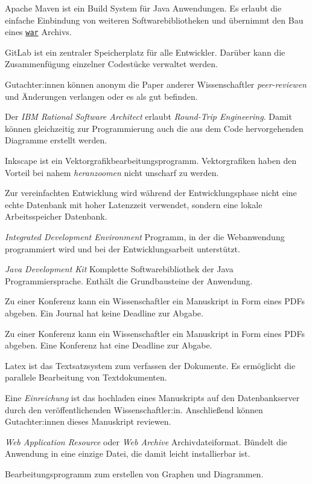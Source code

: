 
\begin{description}
	 Apache Maven ist ein Build System für Java Anwendungen. Es erlaubt die einfache Einbindung von weiteren Softwarebibliotheken und übernimmt den Bau eines \hyperref[glo:war]{\texttt{war}} Archivs.

	 GitLab ist ein zentraler Speicherplatz für alle Entwickler. Darüber kann die Zusammenfügung einzelner Codestücke verwaltet werden.

	 Gutachter:innen können anonym die Paper anderer Wissenschaftler \emph{peer-reviewen} und Änderungen verlangen oder es als gut befinden.

	 Der \emph{IBM Rational Software Architect} erlaubt \emph{Round-Trip Engineering}. Damit können gleichzeitig zur Programmierung auch die aus dem Code hervorgehenden Diagramme erstellt werden.

	 Inkscape ist ein Vektorgrafikbearbeitungsprogramm. Vektorgrafiken haben den Vorteil bei nahem \emph{heranzoomen} nicht unscharf zu werden.

	 Zur vereinfachten Entwicklung wird während der Entwicklungsphase nicht eine echte Datenbank mit hoher Latenzzeit verwendet, sondern eine lokale Arbeitsspeicher Datenbank.

	 \emph{Integrated Development Environment} Programm, in der die Webanwendung programmiert wird und bei der Entwicklungsarbeit unterstützt.

	 \emph{Java Development Kit} Komplette Softwarebibliothek der Java Programmiersprache. Enthält die Grundbausteine der Anwendung.

	 Zu einer Konferenz kann ein Wissenschaftler ein Manuskript in Form eines PDFs abgeben. Ein Journal hat keine Deadline zur Abgabe.

	 Zu einer Konferenz kann ein Wissenschaftler ein Manuskript in Form eines PDFs abgeben. Eine Konferenz hat eine Deadline zur Abgabe.

	 Latex ist das Textsatzsystem zum verfassen der Dokumente. Es ermöglicht die parallele Bearbeitung von Textdokumenten.

	 Eine \emph{Einreichung} ist das hochladen eines Manuskripts auf den Datenbankserver durch den veröffentlichenden Wissenschaftler:in. Anschließend können Gutachter:innen dieses Manuskript reviewen.

	 \emph{Web Application Resource} oder \emph{Web Archive} Archivdateiformat. Bündelt die Anwendung in eine einzige Datei, die damit leicht installierbar ist.

	 Bearbeitungsprogramm zum erstellen von Graphen und Diagrammen.
\end{description}
